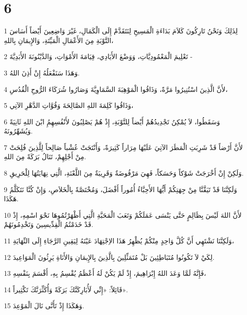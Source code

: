 \chapter{6}

\par 1 لِذَلِكَ وَنَحْنُ تَارِكُونَ كَلاَمَ بَدَاءَةِ الْمَسِيحِ لِنَتَقَدَّمْ إِلَى الْكَمَالِ، غَيْرَ وَاضِعِينَ أَيْضاً أَسَاسَ التَّوْبَةِ مِنَ الأَعْمَالِ الْمَيِّتَةِ، وَالإِيمَانِ بِاللهِ،
\par 2 تَعْلِيمَ الْمَعْمُودِيَّاتِ، وَوَضْعَ الأَيَادِي، قِيَامَةَ الأَمْوَاتِ، وَالدَّيْنُونَةَ الأَبَدِيَّةَ -
\par 3 وَهَذَا سَنَفْعَلُهُ إِنْ أَذِنَ اللهُ.
\par 4 لأَنَّ الَّذِينَ اسْتُنِيرُوا مَرَّةً، وَذَاقُوا الْمَوْهِبَةَ السَّمَاوِيَّةَ وَصَارُوا شُرَكَاءَ الرُّوحِ الْقُدُسِ،
\par 5 وَذَاقُوا كَلِمَةَ اللهِ الصَّالِحَةَ وَقُوَّاتِ الدَّهْرِ الآتِي،
\par 6 وَسَقَطُوا، لاَ يُمْكِنُ تَجْدِيدُهُمْ أَيْضاً لِلتَّوْبَةِ، إِذْ هُمْ يَصْلِبُونَ لأَنْفُسِهِمُِ ابْنَ اللهِ ثَانِيَةً وَيُشَهِّرُونَهُ.
\par 7 لأَنَّ أَرْضاً قَدْ شَرِبَتِ الْمَطَرَ الآتِيَ عَلَيْهَا مِرَاراً كَثِيرَةً، وَأَنْتَجَتْ عُشْباً صَالِحاً لِلَّذِينَ فُلِحَتْ مِنْ أَجْلِهِمْ، تَنَالُ بَرَكَةً مِنَ اللهِ.
\par 8 وَلَكِنْ إِنْ أَخْرَجَتْ شَوْكاً وَحَسَكاً، فَهِيَ مَرْفُوضَةٌ وَقَرِيبَةٌ مِنَ اللَّعْنَةِ، الَّتِي نِهَايَتُهَا لِلْحَرِيقِ.
\par 9 وَلَكِنَّنَا قَدْ تَيَقَّنَّا مِنْ جِهَتِكُمْ أَيُّهَا الأَحِبَّاءُ أُمُوراً أَفْضَلَ، وَمُخْتَصَّةً بِالْخَلاَصِ، وَإِنْ كُنَّا نَتَكَلَّمُ هَكَذَا.
\par 10 لأَنَّ اللهَ لَيْسَ بِظَالِمٍ حَتَّى يَنْسَى عَمَلَكُمْ وَتَعَبَ الْمَحَبَّةِ الَّتِي أَظْهَرْتُمُوهَا نَحْوَ اسْمِهِ، إِذْ قَدْ خَدَمْتُمُ الْقِدِّيسِينَ وَتَخْدِمُونَهُمْ.
\par 11 وَلَكِنَّنَا نَشْتَهِي أَنَّ كُلَّ وَاحِدٍ مِنْكُمْ يُظْهِرُ هَذَا الاِجْتِهَادَ عَيْنَهُ لِيَقِينِ الرَّجَاءِ إِلَى النِّهَايَةِ،
\par 12 لِكَيْ لاَ تَكُونُوا مُتَبَاطِئِينَ بَلْ مُتَمَثِّلِينَ بِالَّذِينَ بِالإِيمَانِ وَالأَنَاةِ يَرِثُونَ الْمَوَاعِيدَ.
\par 13 فَإِنَّهُ لَمَّا وَعَدَ اللهُ إِبْرَاهِيمَ، إِذْ لَمْ يَكُنْ لَهُ أَعْظَمُ يُقْسِمُ بِهِ، أَقْسَمَ بِنَفْسِهِ،
\par 14 قَائِلاً: «إِنِّي لَأُبَارِكَنَّكَ بَرَكَةً وَأُكَثِّرَنَّكَ تَكْثِيراً».
\par 15 وَهَكَذَا إِذْ تَأَنَّى نَالَ الْمَوْعِدَ.
